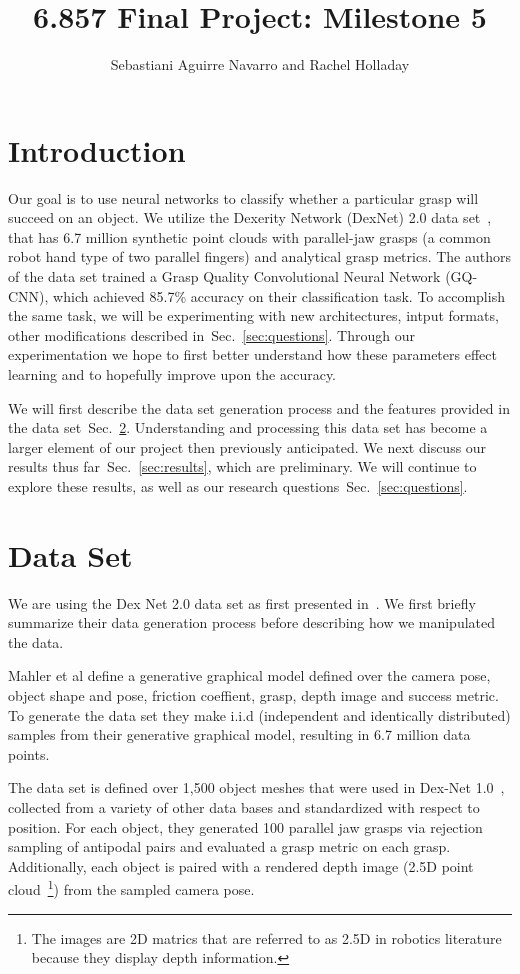 \documentclass[letterpaper, 10 pt, conference]{../ieeeconf}
\newcommand{\sref}[1]{Sec.~\ref{#1}} %
\begin{document}
\title{6.857 Final Project: Milestone 5}
\author{Sebastiani Aguirre Navarro and Rachel Holladay}
\maketitle

\section{Introduction}
Our goal is to use neural networks to classify whether a particular grasp will succeed on an object.
We utilize the Dexerity Network (DexNet) 2.0 data set~\cite{mahler2017dex}, that has 6.7 million synthetic point clouds with parallel-jaw grasps (a common robot hand type of two parallel fingers) and analytical grasp metrics.
The authors of the data set trained a Grasp Quality Convolutional Neural Network (GQ-CNN), which achieved 85.7\% accuracy on their classification task.
To accomplish the same task, we will be experimenting with new architectures, intput formats, other modifications described in~\sref{sec:questions}.
Through our experimentation we hope to first better understand how these parameters effect learning and to hopefully improve upon the accuracy. 

We will first describe the data set generation process and the features provided in the data set~\sref{sec:data_set}. 
Understanding and processing this data set has become a larger element of our project then previously anticipated. 
We next discuss our results thus far~\sref{sec:results}, which are preliminary. 
We will continue to explore these results, as well as our research questions~\sref{sec:questions}. 


\section{Data Set}
\label{sec:data_set}
We are using the Dex Net 2.0 data set as first presented in~\cite{mahler2017dex}. 
We first briefly summarize their data generation process before describing how we manipulated the data. 

Mahler et al define a generative graphical model defined over the camera pose, object shape and pose, friction coeffient, grasp, depth image and success metric. 
To generate the data set they make i.i.d (independent and identically distributed) samples from their generative graphical model, resulting in 6.7 million data points. 

The data set is defined over 1,500 object meshes that were used in Dex-Net 1.0~\cite{mahler2016dex}, collected from a variety of other data bases and standardized with respect to position.
For each object, they generated 100 parallel jaw grasps via rejection sampling of antipodal pairs and evaluated a grasp metric on each grasp. 
Additionally, each object is paired with a rendered depth image (2.5D point cloud~\footnote{The images are 2D matrics that are referred to as 2.5D in robotics literature because they display depth information.}) from the sampled camera pose. 
\end{document}

